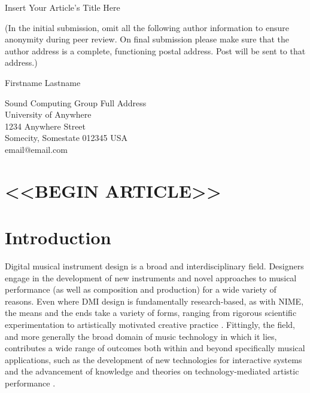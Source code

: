 \documentclass[letterpaper, 12pt]{article}
\begin{document}
{\cmjTitle Insert Your Article's Title Here}
\vspace*{24pt}

(In the initial submission, omit all the following author information to ensure anonymity during peer review.
On final submission please make sure that the author address is a complete, functioning postal address.
Post will be sent to that address.)

{\cmjAuthor Firstname Lastname}	%
 
\begin{cmjAuthorAddress}
	Sound Computing Group Full Address\\
	University of Anywhere\\
	1234 Anywhere Street\\
	Somecity, Somestate 012345 USA\\		%
	email@email.com
\end{cmjAuthorAddress}


\begin{abstract}
Insert abstract here, typically about 150--200 words.
\end{abstract}

\section{<<BEGIN ARTICLE>>}

\section{Introduction}

Digital musical instrument design is a broad and interdisciplinary field. Designers engage in the development of new instruments and novel approaches to musical performance (as well as composition and production) for a wide variety of reasons. Even where DMI design is fundamentally research-based, as with NIME, the means and the ends take a variety of forms, ranging from rigorous scientific experimentation to artistically motivated creative practice \citep{Gurevich2016}. Fittingly, the field, and more generally the broad domain of music technology in which it lies, contributes a wide range of outcomes both within and beyond specifically musical applications, such as the development of new technologies for interactive systems \citep{malloch2018generalized} and the advancement of knowledge and theories on technology-mediated artistic performance \citep{Tahlroglu2020}. 
\end{document}
